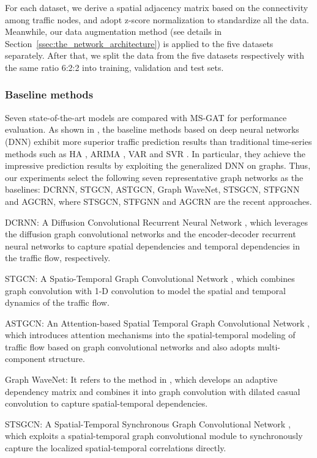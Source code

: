 For each dataset, we derive a spatial adjacency matrix based on the connectivity among traffic nodes, and adopt z-score normalization to standardize all the data. Meanwhile, our data augmentation method (see details in Section~\ref{ssec:the_network_architecture}) is applied to the five datasets separately. After that, we split the data from the five datasets respectively with the same ratio 6:2:2 into training, validation and test sets.

\subsubsection{Baseline methods}
Seven state-of-the-art models are compared with MS-GAT for performance evaluation. As shown in \cite{song2020spatial,mengzhang2020spatial}, the baseline methods based on deep neural networks (DNN) exhibit more superior traffic prediction results than traditional time-series methods such as HA \cite{liu2004summary}, ARIMA \cite{williams2003modeling}, VAR \cite{zivot2006vector} and SVR \cite{1364002}. In particular, they achieve the impressive prediction results by exploiting the generalized DNN on graphs. Thus, our experiments select the following seven representative graph networks as the baselines: DCRNN, STGCN, ASTGCN, Graph WaveNet, STSGCN, STFGNN and AGCRN, where STSGCN, STFGNN and AGCRN are the recent approaches.  

DCRNN: A Diffusion Convolutional Recurrent Neural Network \cite{li2017diffusion}, which leverages the diffusion graph convolutional networks and the encoder-decoder recurrent neural networks to capture spatial dependencies and temporal dependencies in the traffic flow, respectively.

STGCN: A Spatio-Temporal Graph Convolutional Network \cite{yu2017spatio}, which combines graph convolution with 1-D convolution to model the spatial and temporal dynamics of the traffic flow.

ASTGCN: An Attention-based Spatial Temporal Graph Convolutional Network \cite{guo2019attention}, which introduces attention mechanisms into the spatial-temporal modeling of traffic flow based on graph convolutional networks and also adopts multi-component structure.

Graph WaveNet: It refers to the method in \cite{wu2019graph}, which develops an adaptive dependency matrix and combines it into graph convolution with dilated casual convolution to capture spatial-temporal dependencies.

STSGCN: A Spatial-Temporal Synchronous Graph Convolutional Network \cite{song2020spatial}, which exploits a spatial-temporal graph convolutional module to synchronously capture the localized spatial-temporal correlations directly.

